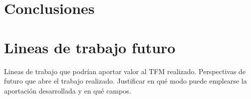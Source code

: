 \documentclass[../tfm.tex]{subfiles}
\begin{document}
\section{Conclusiones}

\section{Lineas de trabajo futuro}

Lineas de trabajo que podrían aportar valor al TFM realizado. Perspectivas de futuro que abre el trabajo realizado. Justificar en qué modo puede emplearse la aportación desarrollada y en qué campos.
\end{document}
